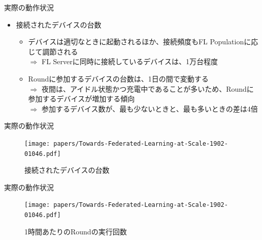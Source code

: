\documentclass[dvipdfmx,notheorems,t]{beamer}
\begin{document}
\begin{frame}{実際の動作状況}

\begin{itemize}
	\item 接続されたデバイスの台数
	\begin{itemize}
		\item デバイスは適切なときに起動されるほか、接続頻度もFL Populationに応じて調節される \\
		$\Rightarrow$ FL Serverに同時に接続しているデバイスは、1万台程度
		\newline
		
		\item Roundに参加するデバイスの台数は、1日の間で変動する \\
		$\Rightarrow$ 夜間は、アイドル状態かつ充電中であることが多いため、Roundに参加するデバイスが増加する傾向 \\
		$\Rightarrow$ 参加するデバイス数が、最も少ないときと、最も多いときの差は4倍
	\end{itemize}
\end{itemize}

\end{frame}

\begin{frame}{実際の動作状況}

\begin{figure}
	\centering
	\texttt{[image: papers/Towards-Federated-Learning-at-Scale-1902-01046.pdf]}
	\caption{接続されたデバイスの台数~\cite{DBLP:journals/corr/abs-1902-01046}}
	\label{fig:connected-devices}
\end{figure}

\end{frame}

\begin{frame}{実際の動作状況}

\begin{figure}
	\centering
	\texttt{[image: papers/Towards-Federated-Learning-at-Scale-1902-01046.pdf]}
	\caption{1時間あたりのRoundの実行回数~\cite{DBLP:journals/corr/abs-1902-01046}}
	\label{fig:round-completion-rate}
\end{figure}

\end{frame}
\end{document}
